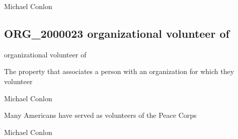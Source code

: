 \documentclass[letterpaper,10pt,english]{sphinxmanual}
\begin{document}
\begin{sphinxShadowBox}

\sphinxAtStartPar
Michael Conlon 
\end{sphinxShadowBox}
\begin{quote}

\ignorespaces \end{quote}


\subsection{ORG\_2000023 \sphinxhyphen{} organizational volunteer of}
\label{\detokenize{doc-ORG_2000023:org-2000023-organizational-volunteer-of}}\label{\detokenize{doc-ORG_2000023:index-0}}\label{\detokenize{doc-ORG_2000023::doc}}
\begin{sphinxShadowBox}

\sphinxAtStartPar
organizational volunteer of
\end{sphinxShadowBox}

\begin{sphinxShadowBox}

\sphinxAtStartPar
The property that associates a person with an organization for which they volunteer
\end{sphinxShadowBox}

\begin{sphinxShadowBox}

\sphinxAtStartPar
Michael Conlon 
\end{sphinxShadowBox}

\begin{sphinxShadowBox}

\sphinxAtStartPar
Many Americans have served as volunteers of the Peace Corps
\end{sphinxShadowBox}

\begin{sphinxShadowBox}

\sphinxAtStartPar
Michael Conlon 
\end{sphinxShadowBox}
\begin{quote}

\ignorespaces \end{quote}
\end{document}

